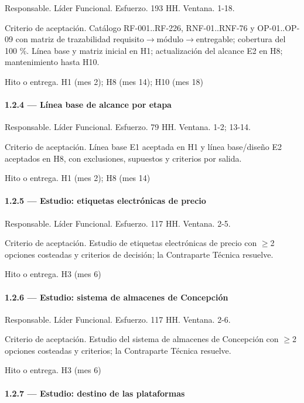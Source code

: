 \documentclass[11pt]{article}
\begin{document}
Responsable. Líder Funcional. Esfuerzo. 193 HH. Ventana. 1-18.

Criterio de aceptación. Catálogo RF-001..RF-226, RNF-01..RNF-76 y OP-01..OP-09 con matriz de trazabilidad requisito\(\rightarrow\)\allowbreak módulo\(\rightarrow\)\allowbreak entregable; cobertura del 100 \%. Línea base y matriz inicial en H1; actualización del alcance E2 en H8; mantenimiento hasta H10.

Hito o entrega. H1 (mes 2); H8 (mes 14); H10 (mes 18)

\paragraph{1.2.4 — Línea base de alcance por etapa}

Responsable. Líder Funcional. Esfuerzo. 79 HH. Ventana. 1-2; 13-14.

Criterio de aceptación. Línea base E1 aceptada en H1 y línea base/diseño E2 aceptados en H8, con exclusiones, supuestos y criterios por salida.

Hito o entrega. H1 (mes 2); H8 (mes 14)

\paragraph{1.2.5 — Estudio: etiquetas electrónicas de precio}

Responsable. Líder Funcional. Esfuerzo. 117 HH. Ventana. 2-5.

Criterio de aceptación. Estudio de etiquetas electrónicas de precio con \(\geq\)2 opciones costeadas y criterios de decisión; la Contraparte Técnica resuelve.

Hito o entrega. H3 (mes 6)

\paragraph{1.2.6 — Estudio: sistema de almacenes de Concepción}

Responsable. Líder Funcional. Esfuerzo. 117 HH. Ventana. 2-6.

Criterio de aceptación. Estudio del sistema de almacenes de Concepción con \(\geq\)2 opciones costeadas y criterios; la Contraparte Técnica resuelve.

Hito o entrega. H3 (mes 6)

\paragraph{1.2.7 — Estudio: destino de las plataformas}
\end{document}
